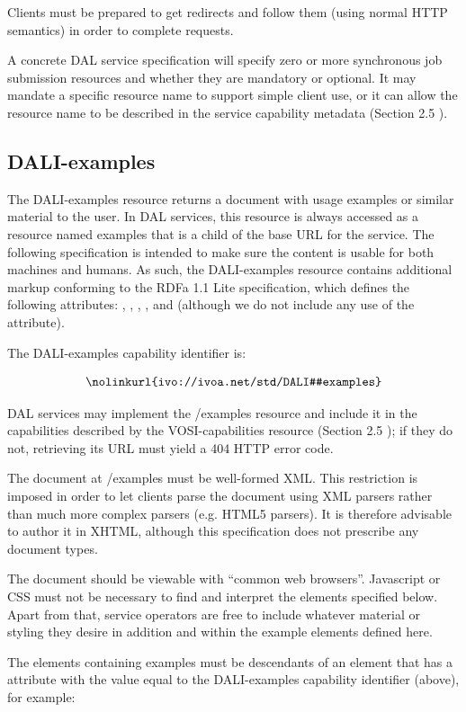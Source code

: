 \documentclass[11pt,letter]{ivoa}
\begin{document}
Clients must be prepared to get redirects and follow them (using normal HTTP 
semantics) in order to complete requests.

A concrete DAL service specification will specify zero or more synchronous job 
submission resources and whether they are mandatory or optional. It may mandate 
a specific resource name to support simple client use, or it can allow the 
resource name to be described in the service capability metadata (Section 2.5 ).

\subsection{DALI-examples}
\label{sec:dali-examples}
The DALI-examples resource returns a document with usage examples or similar 
material to the user. In DAL services, this resource is always accessed as a 
resource named examples that is a child of the base URL for the service. The 
following specification is intended to make sure the content is usable for both 
machines and humans. As such, the DALI-examples resource contains additional 
markup conforming to the RDFa 1.1 Lite \citep{std:RDFaLite11} specification, 
which defines the 
following attributes: , , ,
, and  (although we 
do not include any use of the  attribute).

The DALI-examples capability identifier is:

$$
\hbox{\nolinkurl{ivo://ivoa.net/std/DALI#examples}}
$$

DAL services may implement the /examples resource and include it in the 
capabilities described by the VOSI-capabilities resource (Section 2.5 ); if they 
do not, retrieving its URL must yield a 404 HTTP error code.

The document at /examples must be well-formed XML. This restriction is imposed 
in order to let clients parse the document using XML parsers rather than 
much more complex parsers (e.g. HTML5 parsers). It is therefore advisable to 
author it in XHTML, although this specification does not prescribe any document 
types.

The document should be viewable with ``common web browsers''. Javascript or CSS 
must not be necessary to find and interpret the elements specified below.  Apart 
from that, service operators are free to include whatever material or styling 
they desire in addition and within the example elements defined here.

The elements containing examples must be descendants of an element that has a 
 attribute with the value equal to the DALI-examples capability identifier 
(above), for example:
\end{document}
